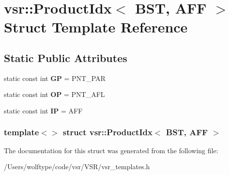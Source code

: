 \hypertarget{structvsr_1_1_product_idx_3_01_b_s_t_00_01_a_f_f_01_4}{\section{vsr\-:\-:Product\-Idx$<$ B\-S\-T, A\-F\-F $>$ Struct Template Reference}
\label{structvsr_1_1_product_idx_3_01_b_s_t_00_01_a_f_f_01_4}
}
\subsection*{Static Public Attributes}
\begin{DoxyCompactItemize}
\item 
\hypertarget{structvsr_1_1_product_idx_3_01_b_s_t_00_01_a_f_f_01_4_ad13511529000bcb056e79d00f97839f8}{static const int {\bfseries G\-P} = P\-N\-T\-\_\-\-P\-A\-R}\label{structvsr_1_1_product_idx_3_01_b_s_t_00_01_a_f_f_01_4_ad13511529000bcb056e79d00f97839f8}

\item 
\hypertarget{structvsr_1_1_product_idx_3_01_b_s_t_00_01_a_f_f_01_4_ab2d3795b4c35a7ddf93d21ec02d8689d}{static const int {\bfseries O\-P} = P\-N\-T\-\_\-\-A\-F\-L}\label{structvsr_1_1_product_idx_3_01_b_s_t_00_01_a_f_f_01_4_ab2d3795b4c35a7ddf93d21ec02d8689d}

\item 
\hypertarget{structvsr_1_1_product_idx_3_01_b_s_t_00_01_a_f_f_01_4_a4710ca0a7a2eb84f8689a40097944a72}{static const int {\bfseries I\-P} = A\-F\-F}\label{structvsr_1_1_product_idx_3_01_b_s_t_00_01_a_f_f_01_4_a4710ca0a7a2eb84f8689a40097944a72}

\end{DoxyCompactItemize}
\subsubsection*{template$<$$>$ struct vsr\-::\-Product\-Idx$<$ B\-S\-T, A\-F\-F $>$}



The documentation for this struct was generated from the following file\-:\begin{DoxyCompactItemize}
\item 
/\-Users/wolftype/code/vsr/\-V\-S\-R/vsr\-\_\-templates.\-h\end{DoxyCompactItemize}
